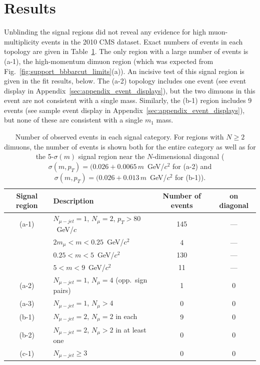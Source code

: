 \section{Results}
Unblinding the signal regions did not reveal any evidence for high muon-multiplicity events in the 2010 CMS dataset.  Exact numbers of events in each topology are given in Table~\ref{tab:results}.
The only region with a large number of events is (a-1), the
high-momentum dimuon region (which was expected from
Fig.~\ref{fig:support_bbbarcut_limits}(a)).  An incisive test of this
signal region is given in the fit results, below.  The (a-2) topology
includes one event (see event display in Appendix~\ref{sec:appendix_event_displays}), but the two dimuons in
this event are not consistent with a single mass.  Similarly, the
(b-1) region includes 9 events (see sample event display in
Appendix~\ref{sec:appendix_event_displays}), but none of these are
consistent with a single $m_1$ mass.

\begin{table}[tbh]
\caption{Number of observed events in each signal category.  For regions
  with $N \ge 2$ dimuons, the number of events is shown both for the entire category 
  as well as for the 5-$\sigma(m)$ signal region near the $N$-dimensional diagonal ($\sigma(m,p_T) = (0.026 + 0.0065\, m$~GeV/$c^2$ for (a-2) and $\sigma(m,p_T) = (0.026 + 0.013\, m$~GeV/$c^2$ for (b-1)). \label{tab:results}}
\vspace{0.1 cm}
\begin{tabular}{c l | c c}
\hline\hline Signal region & Description & Number of events & on diagonal \\\hline
(a-1) & $N_{\mu-jet} = 1$, $N_{\mu} = 2$, $p_T > 80$~GeV/$c$ & 145 & --- \\
& $2m_\mu < m < 0.25$~GeV/$c^2$ & 4 & --- \\
& $0.25 < m < 5$~GeV/$c^2$ & 130 & --- \\
& $5 < m < 9$~GeV/$c^2$ & 11 & --- \\
(a-2) & $N_{\mu-jet} = 1$, $N_{\mu} = 4$ (opp.\ sign pairs) & 1 & 0 \\
(a-3) & $N_{\mu-jet} = 1$, $N_{\mu} > 4$ & 0 & 0 \\
(b-1) & $N_{\mu-jet} = 2$, $N_{\mu} = 2$ in each & 9 & 0 \\
(b-2) & $N_{\mu-jet} = 2$, $N_{\mu} > 2$ in at least one & 0 & 0 \\
(c-1) & $N_{\mu-jet} \ge 3$ & 0 & 0 \\\hline\hline
\end{tabular}
\vspace{0.1 cm}
\end{table}

